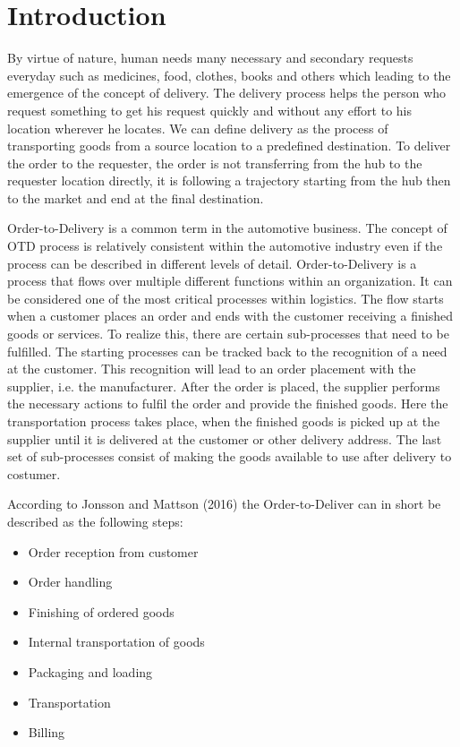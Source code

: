 \vspace{10mm} %
 
\vfill

\section{ Introduction }

\hspace{2cm} By virtue of nature, human needs many necessary and secondary requests everyday such as medicines, food, clothes, books and others which leading to the emergence of the concept of delivery. The delivery process helps the person who request something to get his request quickly and without any effort to his location wherever he locates. We can define delivery as the process of transporting goods from a source location to a predefined destination. 
To deliver the order to the requester, the order is not transferring from the hub to the requester location directly, it is following a trajectory starting from the hub then to the market and end at the final destination.
\par
Order-to-Delivery is a common term in the automotive business. The concept of OTD process is relatively consistent within the automotive industry even if the process can be described in different levels of detail.
Order-to-Delivery is a process that flows over multiple different functions within an organization. It can be considered one of the most critical processes within logistics. The flow starts when a customer places an order and ends with the customer receiving a finished goods or services. To realize this, there are certain sub-processes that need to be fulfilled. The starting processes can be tracked back to the recognition of a need at the customer. This recognition will lead to an order placement with the supplier, i.e. the manufacturer. After the order is placed, the supplier performs the necessary actions to fulfil the order and provide the finished goods. Here the transportation process takes place, when the finished goods is picked up at the supplier until it is delivered at the customer or other delivery address. The last set of sub-processes consist of making the goods available to use after delivery to costumer.
\par According to Jonsson and Mattson (2016) the Order-to-Deliver can in short be described as the following steps:

\begin{itemize}
    \item Order reception from customer 
    \item Order handling 
    \item Finishing of ordered goods
    \item Internal transportation of goods
    \item Packaging and loading
    \item Transportation
    \item Billing
\end{itemize}

